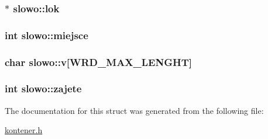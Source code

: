 \subsubsection[{lok}]{$\ast$ slowo\+::lok}\label{structslowo_a8310a3996804f2f7ab2a1124b0a14617}
\hypertarget{structslowo_ab6457a7c7e89a1b03ddd1f4282fa1a00}{}
\subsubsection[{miejsce}]{\setlength{\rightskip}{0pt plus 5cm}int slowo\+::miejsce}\label{structslowo_ab6457a7c7e89a1b03ddd1f4282fa1a00}
\hypertarget{structslowo_a155485348d375daf1428b1a631808e46}{}
\subsubsection[{v}]{\setlength{\rightskip}{0pt plus 5cm}char slowo\+::v\mbox{[}{\bf W\+R\+D\+\_\+\+M\+A\+X\+\_\+\+L\+E\+N\+G\+H\+T}\mbox{]}}\label{structslowo_a155485348d375daf1428b1a631808e46}
\hypertarget{structslowo_a7049547b2831ec4ce08c4b9419621fe8}{}
\subsubsection[{zajete}]{\setlength{\rightskip}{0pt plus 5cm}int slowo\+::zajete}\label{structslowo_a7049547b2831ec4ce08c4b9419621fe8}


The documentation for this struct was generated from the following file\+:\begin{DoxyCompactItemize}
\item 
\hyperlink{kontener_8h}{kontener.\+h}\end{DoxyCompactItemize}
